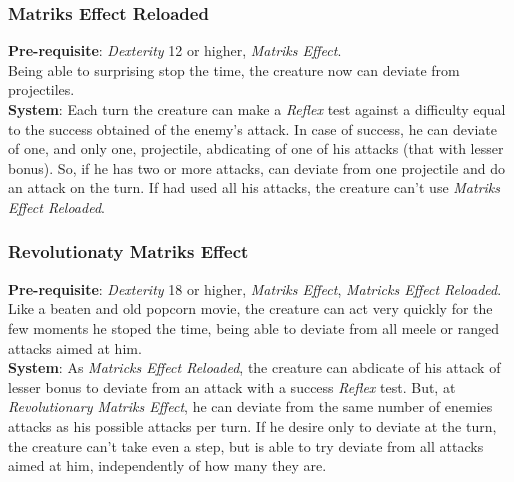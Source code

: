 \documentclass[ letterpaper,12pt]{article}
\begin{document}
\subsubsection{Matriks Effect Reloaded}
{\bf Pre-requisite}: {\it Dexterity} 12 or higher, {\it Matriks Effect}.\\
Being able to surprising stop the time, the creature now can deviate from projectiles.\\
{\bf System}: Each turn the creature can make a {\it Reflex} test against a difficulty equal to the success obtained of the enemy's attack. In case of success, he can deviate of one, and only one, projectile, abdicating of one of his attacks (that with lesser bonus). So, if he has two or more attacks, can deviate from one projectile and do an attack on the turn. If had used all his attacks, the creature can't use {\it Matriks Effect Reloaded}.

\subsubsection{Revolutionaty Matriks Effect}
{\bf Pre-requisite}: {\it Dexterity} 18 or higher, {\it Matriks Effect}, {\it Matricks Effect Reloaded}.\\
Like a beaten and old popcorn movie, the creature can act very quickly for the few moments he stoped the time, being able to deviate from all meele or ranged attacks aimed at him.\\
{\bf System}: As {\it Matricks Effect Reloaded}, the creature can abdicate of his attack of lesser bonus to deviate from an attack with a success {\it Reflex} test. But, at {\it Revolutionary Matriks Effect}, he can deviate from the same number of enemies attacks as his possible attacks per turn. If he desire only to deviate at the turn, the creature can't take even a step, but is able to try deviate from all attacks aimed at him, independently of how many they are.
\end{document}
